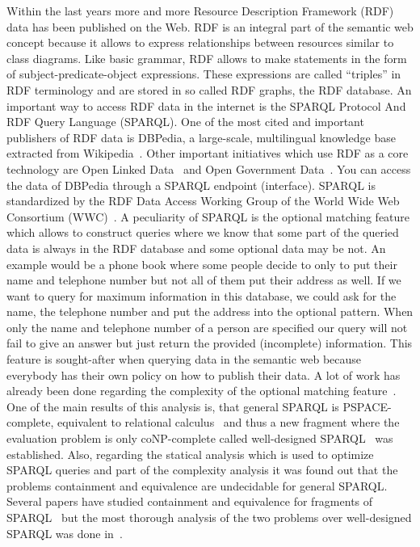 Within the last years more and more Resource Description Framework
(RDF)~\cite{rdf} data has been published on the Web. RDF is an integral part of the semantic web concept
because it allows to express relationships between resources similar to class
diagrams. Like basic grammar, RDF allows to make statements in the form of subject-predicate-object
expressions. These expressions are called ``triples'' in RDF terminology and are
stored in so called RDF graphs, the RDF database.
An important way to access RDF data in the internet is the SPARQL Protocol And
RDF Query Language (SPARQL). One of the most cited and important publishers of
RDF data is DBPedia, a large-scale, multilingual knowledge base extracted from
Wikipedia~\cite{lehmann2015dbpedia}. Other important initiatives which use RDF
as a core technology are Open Linked Data~\cite{bizer2009linked,lee2006design}
and Open Government Data~\cite{datagov,datagovuk}. You can access the data of DBPedia through
a SPARQL endpoint (interface). 
SPARQL is standardized by the RDF Data Access Working Group of the World Wide
Web Consortium (WWC)~\cite{w3standard}. A peculiarity of SPARQL is the optional
matching feature which allows to construct queries where we know that some part
of the queried data is always in the RDF database and some optional data may be
not. An example would be a phone book where some people decide to
only to put their name and telephone number but not all of them put their
address as well. If we want to query for maximum information in this database, 
we could ask for the name, the telephone number and put the address into the
optional pattern. When only the name and telephone number of a person are
specified our query will not fail to give an answer but just return the provided (incomplete)
information. This feature is sought-after when querying data in the semantic web
because everybody has their own policy on how to publish their data.
A lot of work has already been done regarding the complexity of the optional matching 
feature~\cite{angles2008expressive,perez2009semantics,schmidt2010foundations,arenas2011querying,kaminski_bwd}.
One of the main results of this analysis is, that general SPARQL is
PSPACE-complete, equivalent to relational
calculus~\cite{angles2008expressive,polleres2007sparql} 
and thus a new fragment where the evaluation
problem is only coNP-complete called well-designed
SPARQL~\cite{perez2009semantics} was established. Also, regarding the statical
analysis which is used to optimize SPARQL queries and part of the complexity
analysis it was found out that the
problems containment and equivalence are undecidable for general SPARQL. Several
papers have studied containment and equivalence for fragments of
SPARQL~\cite{serfiotis2005containment,wudage2012sparql,letelier2012static,letelier2013static} but the
most thorough analysis of the two problems over well-designed SPARQL was done in~\cite{pichler2014containment}.

